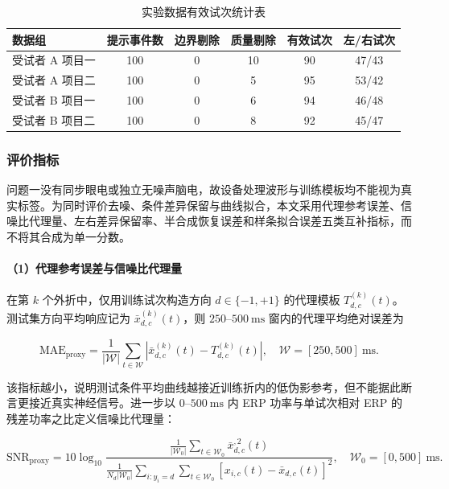 \documentclass[a4paper]{ctexart}
\numberwithin{figure}{section}       %
\begin{document}
\begin{table}[H]
    \centering
    \caption{实验数据有效试次统计表}
    \label{tab:q1_trial_audit}
    \begin{tabular}{lccccc}
        \toprule
        \textbf{数据组} & \textbf{提示事件数} & \textbf{边界剔除} & \textbf{质量剔除} & \textbf{有效试次} & \textbf{左/右试次} \\
        \midrule
        受试者 A 项目一 & 100 & 0 & 10 & 90 & 47/43 \\
        受试者 A 项目二 & 100 & 0 & 5  & 95 & 53/42 \\
        受试者 B 项目一 & 100 & 0 & 6  & 94 & 46/48 \\
        受试者 B 项目二 & 100 & 0 & 8  & 92 & 45/47 \\
        \bottomrule
    \end{tabular}
\end{table}

\subsubsection{评价指标}

问题一没有同步眼电或独立无噪声脑电，故设备处理波形与训练模板均不能视为真实标签。为同时评价去噪、条件差异保留与曲线拟合，本文采用代理参考误差、信噪比代理量、左右差异保留率、半合成恢复误差和样条拟合误差五类互补指标，而不将其合成为单一分数。

\paragraph{（1）代理参考误差与信噪比代理量}

在第 $k$ 个外折中，仅用训练试次构造方向 $d\in\{-1,+1\}$ 的代理模板 $T^{(k)}_{d,c}(t)$。测试集方向平均响应记为 $\bar{x}^{(k)}_{d,c}(t)$，则 $250$--$500~\mathrm{ms}$ 窗内的代理平均绝对误差为

\begin{equation}
    \mathrm{MAE}_{\mathrm{proxy}}=
    \frac{1}{|\mathcal{W}|}\sum_{t\in\mathcal{W}}
    \left|\bar{x}^{(k)}_{d,c}(t)-T^{(k)}_{d,c}(t)\right|,
    \quad \mathcal{W}=[250,500]~\mathrm{ms}.
    \label{eq:q1_mae}
\end{equation}

该指标越小，说明测试条件平均曲线越接近训练折内的低伪影参考，但不能据此断言更接近真实神经信号。进一步以 $0$--$500~\mathrm{ms}$ 内 ERP 功率与单试次相对 ERP 的残差功率之比定义信噪比代理量：

\begin{equation}
    \mathrm{SNR}_{\mathrm{proxy}}=10\log_{10}
    \frac{\frac{1}{|\mathcal{W}_0|}\sum_{t\in\mathcal{W}_0}\bar{x}_{d,c}^{,2}(t)}
    {\frac{1}{N_d|\mathcal{W}_0|}\sum_{i:y_i=d}\sum_{t\in\mathcal{W}_0}
    \left[x_{i,c}(t)-\bar{x}_{d,c}(t)\right]^2},
    \quad \mathcal{W}_0=[0,500]~\mathrm{ms}.
    \label{eq:q1_snr}
\end{equation}
\end{document}
